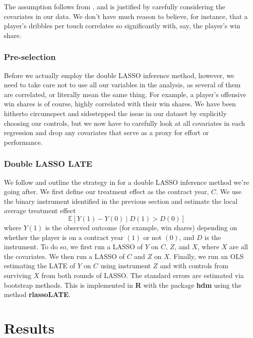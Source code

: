 \documentclass[12pt]{article}
\begin{document}
	The assumption follows from \cite{belloni_high-dimensional_2014}, and is justified by carefully considering the covariates in our data. We don't have much reason to believe, for instance, that a player's dribbles per touch correlates so significantly with, say, the player's win share.
	
	\subsubsection{Pre-selection}
	
	Before we actually employ the double LASSO inference method, however, we need to take care not to use all our variables in the analysis, as several of them are correlated, or literally mean the same thing. For example, a player's offensive win shares is of course, highly correlated with their win shares. We have been hitherto circumspect and sidestepped the issue in our dataset by explicitly choosing our controls, but we now have to carefully look at all covariates in each regression and drop any covariates that serve as a proxy for effort or performance.
	
	\subsubsection{Double LASSO LATE}
	
	We follow and outline the strategy in \cite{chernozhukov_high-dimensional_2016-1} for a double LASSO inference method we're going after. We first define our treatment effect as the contract year, $C$. We use the binary instrument identified in the previous section and estimate the local average treatment effect \[
	\mathbb{E}\left[Y\left(1\right) - Y\left(0\right)\;\vert\; D\left(1\right)> D\left(0\right)\right]
	\] where $Y\left(1\right)$ is the observed outcome (for example, win shares) depending on whether the player is on a contract year $(1)$ or not $(0)$, and $D$ is the instrument. To do so, we first run a LASSO of $Y$ on $C$, $Z$, and $X$, where $X$ are all the covariates. We then run a LASSO of $C$ and $Z$ on $X$. Finally, we run an OLS estimating the LATE of $Y$ on $C$ using instrument $Z$ and with controls from surviving $X$ from both rounds of LASSO. The standard errors are estimated via bootstrap methods. This is implemented in \textbf{R} with the package \textbf{hdm} using the method \textbf{rlassoLATE}.
	
	\section{Results} \label{sec:result}
	
\end{document}

